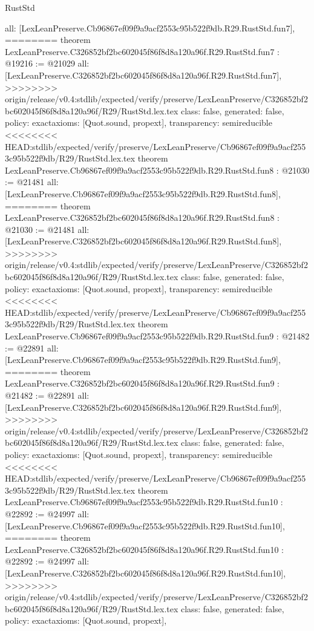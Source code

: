 \begin{lexlean}{RustStd}
\begin{coremodule}
{\begin{coremodule}
{{{{{{{{{{  all: [LexLeanPreserve.Cb96867ef09f9a9acf2553c95b522f9db.R29.RustStd.fun7],
========
theorem LexLeanPreserve.C326852bf2bc602045f86f8d8a120a96f.R29.RustStd.fun7 : @19216 := @21029 {
  all: [LexLeanPreserve.C326852bf2bc602045f86f8d8a120a96f.R29.RustStd.fun7],
>>>>>>>> origin/release/v0.4:stdlib/expected/verify/preserve/LexLeanPreserve/C326852bf2bc602045f86f8d8a120a96f/R29/RustStd.lex.tex
  class: false,
  generated: false,
  policy: exact{axioms: [Quot.sound, propext]},
  transparency: semireducible
}
<<<<<<<< HEAD:stdlib/expected/verify/preserve/LexLeanPreserve/Cb96867ef09f9a9acf2553c95b522f9db/R29/RustStd.lex.tex
theorem LexLeanPreserve.Cb96867ef09f9a9acf2553c95b522f9db.R29.RustStd.fun8 : @21030 := @21481 {
  all: [LexLeanPreserve.Cb96867ef09f9a9acf2553c95b522f9db.R29.RustStd.fun8],
========
theorem LexLeanPreserve.C326852bf2bc602045f86f8d8a120a96f.R29.RustStd.fun8 : @21030 := @21481 {
  all: [LexLeanPreserve.C326852bf2bc602045f86f8d8a120a96f.R29.RustStd.fun8],
>>>>>>>> origin/release/v0.4:stdlib/expected/verify/preserve/LexLeanPreserve/C326852bf2bc602045f86f8d8a120a96f/R29/RustStd.lex.tex
  class: false,
  generated: false,
  policy: exact{axioms: [Quot.sound, propext]},
  transparency: semireducible
}
<<<<<<<< HEAD:stdlib/expected/verify/preserve/LexLeanPreserve/Cb96867ef09f9a9acf2553c95b522f9db/R29/RustStd.lex.tex
theorem LexLeanPreserve.Cb96867ef09f9a9acf2553c95b522f9db.R29.RustStd.fun9 : @21482 := @22891 {
  all: [LexLeanPreserve.Cb96867ef09f9a9acf2553c95b522f9db.R29.RustStd.fun9],
========
theorem LexLeanPreserve.C326852bf2bc602045f86f8d8a120a96f.R29.RustStd.fun9 : @21482 := @22891 {
  all: [LexLeanPreserve.C326852bf2bc602045f86f8d8a120a96f.R29.RustStd.fun9],
>>>>>>>> origin/release/v0.4:stdlib/expected/verify/preserve/LexLeanPreserve/C326852bf2bc602045f86f8d8a120a96f/R29/RustStd.lex.tex
  class: false,
  generated: false,
  policy: exact{axioms: [Quot.sound, propext]},
  transparency: semireducible
}
<<<<<<<< HEAD:stdlib/expected/verify/preserve/LexLeanPreserve/Cb96867ef09f9a9acf2553c95b522f9db/R29/RustStd.lex.tex
theorem LexLeanPreserve.Cb96867ef09f9a9acf2553c95b522f9db.R29.RustStd.fun10 : @22892 := @24997 {
  all: [LexLeanPreserve.Cb96867ef09f9a9acf2553c95b522f9db.R29.RustStd.fun10],
========
theorem LexLeanPreserve.C326852bf2bc602045f86f8d8a120a96f.R29.RustStd.fun10 : @22892 := @24997 {
  all: [LexLeanPreserve.C326852bf2bc602045f86f8d8a120a96f.R29.RustStd.fun10],
>>>>>>>> origin/release/v0.4:stdlib/expected/verify/preserve/LexLeanPreserve/C326852bf2bc602045f86f8d8a120a96f/R29/RustStd.lex.tex
  class: false,
  generated: false,
  policy: exact{axioms: [Quot.sound, propext]},
}}}}}}}}}}}}}}
\end{coremodule}}
\end{coremodule}
\end{lexlean}
